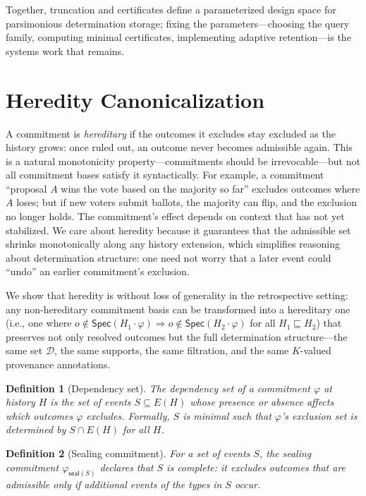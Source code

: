 \documentclass[acmsmall,review,anonymous]{acmart}
\newcommand{\Spec}{\mathsf{Spec}}
\newcommand{\seal}{\mathsf{seal}}
\newtheorem{definition}{Definition}
\theoremstyle{remark}
\numberwithin{definition}{section}
\numberwithin{theorem}{section}
\numberwithin{lemma}{section}
\numberwithin{corollary}{section}
\numberwithin{remark}{section}
\numberwithin{example}{section}
\numberwithin{observation}{section}
\numberwithin{assumption}{section}
\begin{document}
Together, truncation and certificates define a parameterized design
space for parsimonious determination storage; fixing the
parameters---choosing the query family, computing minimal certificates,
implementing adaptive retention---is the systems work that remains.

\section{Heredity Canonicalization}
\label{app:persistence-canonicalization}

A commitment is \emph{hereditary} if the outcomes it excludes stay
excluded as the history grows: once ruled out, an outcome never
becomes admissible again.
This is a natural monotonicity property---commitments should be
irrevocable---but not all commitment bases satisfy it syntactically.
For example, a commitment ``proposal $A$ wins the vote based on the
majority so far''
excludes outcomes where $A$ loses; but if new voters submit ballots, the
majority can flip, and the exclusion no longer holds.
The commitment's effect depends on context that has not yet stabilized.
We care about heredity because it guarantees that the admissible set
shrinks monotonically along any history extension, which simplifies
reasoning about determination structure: one need not worry that a
later event could ``undo'' an earlier commitment's exclusion.

We show that heredity is without loss of generality in the
retrospective setting: any non-hereditary commitment basis can be
transformed into a hereditary one (i.e., one where
$o \notin \Spec(H_1 \cdot \varphi) \Rightarrow o \notin \Spec(H_2 \cdot \varphi)$
for all $H_1 \sqsubseteq H_2$) that preserves not only resolved
outcomes but the full determination structure---the same set
$\mathcal{D}$, the same supports, the same filtration, and the same
$K$-valued provenance annotations.

\begin{definition}[Dependency set]
  The \emph{dependency set} of a commitment $\varphi$ at history $H$ is
  the set of events $S \subseteq E(H)$ whose presence or absence affects
  which outcomes $\varphi$ excludes.
  Formally, $S$ is minimal such that $\varphi$'s exclusion set is
  determined by $S \cap E(H)$ for all $H$.
\end{definition}

\begin{definition}[Sealing commitment]
  For a set of events $S$, the \emph{sealing commitment}
  $\varphi_{\seal(S)}$ declares that $S$ is complete: it excludes
  outcomes that are admissible only if additional events of the types in
  $S$ occur.
\end{definition}
\end{document}
